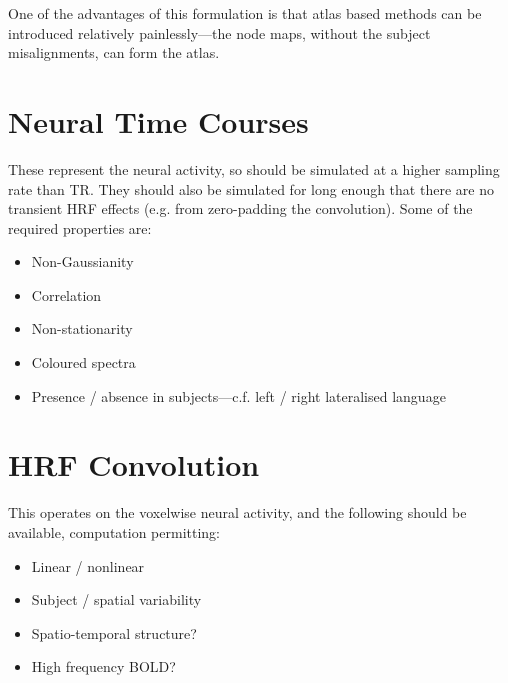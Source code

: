 \documentclass[a4paper, 12pt]{article}
\begin{document}
One of the advantages of this formulation is that atlas based methods can be introduced relatively painlessly---the node maps, without the subject misalignments, can form the atlas.


\section{Neural Time Courses}
\label{sec:TimeCourses}
These represent the neural activity, so should be simulated at a higher sampling rate than TR. 
They should also be simulated for long enough that there are no transient HRF effects (e.g. from zero-padding the convolution). 
Some of the required properties are:
\begin{itemize}
\item{Non-Gaussianity}
\item{Correlation}
\item{Non-stationarity}
\item{Coloured spectra}
\item{Presence / absence in subjects---c.f. left / right lateralised language}
\end{itemize}


\section{HRF Convolution}
\label{sec:HRF}
This operates on the voxelwise neural activity, and the following should be available, computation permitting:
\begin{itemize}
\item{Linear / nonlinear}
\item{Subject / spatial variability}
\item{Spatio-temporal structure?}
\item{High frequency BOLD?}
\end{itemize}

\end{document}
